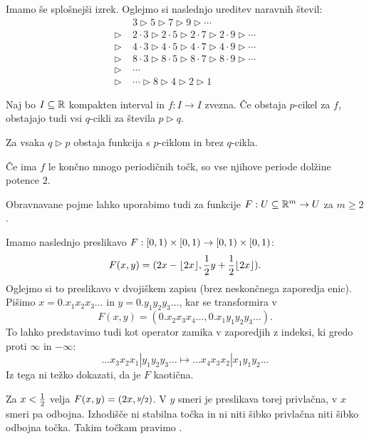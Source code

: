 Imamo še splošnejši izrek.
Oglejmo si naslednjo ureditev naravnih števil:
\begin{align*}
  & 3 \triangleright 5 \triangleright 7 \triangleright 9 \triangleright \cdots \\
  \triangleright\;& 2 \cdot 3 \triangleright 2 \cdot 5 \triangleright 2 \cdot 7 \triangleright 2 \cdot 9 \triangleright \cdots \\
  \triangleright\;& 4 \cdot 3 \triangleright 4 \cdot 5 \triangleright 4 \cdot 7 \triangleright 4 \cdot 9 \triangleright \cdots \\
  \triangleright\;& 8 \cdot 3 \triangleright 8 \cdot 5 \triangleright 8 \cdot 7 \triangleright 8 \cdot 9 \triangleright \cdots \\
  \triangleright\;& \cdots \\
  \triangleright\;& \cdots \triangleright 8 \triangleright 4 \triangleright 2 \triangleright 1
\end{align*}

\begin{izrek}[Šarkovski]
  Naj bo $I \subseteq \mathbb{R}$ kompakten interval in $f: I \to I$ zvezna.
  Če obstaja $p$-cikel za $f$, obstajajo tudi vsi $q$-cikli za števila $p
  \triangleright q$.
\end{izrek}

\begin{izrek}
  Za vsaka $q \triangleright p$ obstaja funkcija s $p$-ciklom in brez $q$-cikla.
\end{izrek}

\begin{posledica}
  Če ima $f$ le končno mnogo periodičnih točk, so vse njihove periode dolžine
  potence $2$.
\end{posledica}


Obravnavane pojme lahko uporabimo tudi za funkcije $F: U \subseteq \mathbb{R}^m \to U$
za $m \ge 2$.

\begin{primer}
  Imamo naslednjo preslikavo $F: \left[0,1\right) \times \left[0,1\right) \to \left[0,1\right) \times
  \left[0,1\right)$:
  \[
	F(x,y) = (2x - \lfloor 2x \rfloor, \frac{1}{2} y + \frac{1}{2} \lfloor 2x \rfloor).
  \]
  Oglejmo si to preslikavo v dvojiškem zapisu (brez neskončnega zaporedja enic).
  Pišimo $x = 0.x_1x_2x_3\ldots$ in $y=0.y_1y_2y_3\ldots$, kar se transformira v
  \[
	F(x,y) = (0.x_2x_3x_4\ldots, 0.x_1y_1y_2y_3\ldots).
  \]
  To lahko predstavimo tudi kot operator zamika v zaporedjih z indeksi, ki gredo
  proti $\infty$ in $-\infty$:
  \[
	\ldots x_3 x_2 x_1 | y_1 y_2 y_3 \ldots
	\mapsto \ldots x_4 x_3 x_2 | x_1 y_1 y_2 \ldots
  \]
  Iz tega ni težko dokazati, da je $F$ kaotična.

  Za $x < \frac{1}{2}$ velja $F(x,y) = (2x, \nicefrac{y}{2})$.
  V $y$ smeri je preslikava torej privlačna, v $x$ smeri pa odbojna.
  Izhodišče ni stabilna točka in ni niti šibko privlačna niti šibko odbojna
  točka.
  Takim točkam pravimo .
  \boxdot{}
\end{primer}

